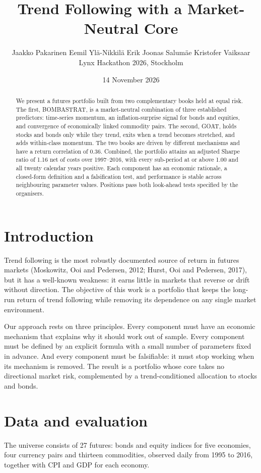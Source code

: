 \documentclass[10.5pt,a4paper]{article}
\title{\textbf{Trend Following with a Market-Neutral Core}}
\author{Jaakko Pakarinen \quad Eemil Ylä-Nikkilä \quad Erik Joonas Salumäe \quad Kristofer Vaiksaar\\[4pt]
\small Lynx Hackathon 2026, Stockholm}
\date{14 November 2026}
\begin{document}
\maketitle

\begin{abstract}
\noindent We present a futures portfolio built from two complementary books held at equal risk. The first, BOMBASTRAT, is a market-neutral combination of three established predictors: time-series momentum, an inflation-surprise signal for bonds and equities, and convergence of economically linked commodity pairs. The second, GOAT, holds stocks and bonds only while they trend, exits when a trend becomes stretched, and adds within-class momentum. The two books are driven by different mechanisms and have a return correlation of 0.36. Combined, the portfolio attains an adjusted Sharpe ratio of 1.16 net of costs over 1997--2016, with every sub-period at or above 1.00 and all twenty calendar years positive. Each component has an economic rationale, a closed-form definition and a falsification test, and performance is stable across neighbouring parameter values. Positions pass both look-ahead tests specified by the organisers.
\end{abstract}

\section{Introduction}
Trend following is the most robustly documented source of return in futures markets (Moskowitz, Ooi and Pedersen, 2012; Hurst, Ooi and Pedersen, 2017), but it has a well-known weakness: it earns little in markets that reverse or drift without direction. The objective of this work is a portfolio that keeps the long-run return of trend following while removing its dependence on any single market environment.

Our approach rests on three principles. Every component must have an economic mechanism that explains why it should work out of sample. Every component must be defined by an explicit formula with a small number of parameters fixed in advance. And every component must be falsifiable: it must stop working when its mechanism is removed. The result is a portfolio whose core takes no directional market risk, complemented by a trend-conditioned allocation to stocks and bonds.

\section{Data and evaluation}
The universe consists of 27 futures: bonds and equity indices for five economies, four currency pairs and thirteen commodities, observed daily from 1995 to 2016, together with CPI and GDP for each economy.
\end{document}
